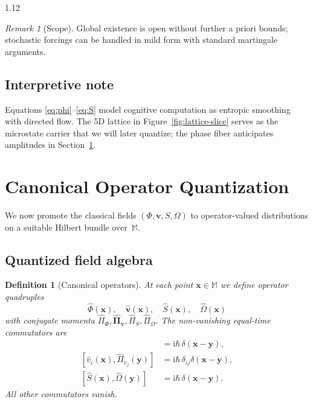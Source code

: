 \documentclass[12pt,a4paper]{article}
\numberwithin{equation}{section}
\newtheorem{definition}{Definition}[section]
\theoremstyle{remark}
\newtheorem{remark}{Remark}[section]
\theoremstyle{definition}
\newcommand{\M}{\mathbb{M}}
\newcommand{\ii}{\mathrm{i}}
\begin{document}
\begin{spacing}{1.12}
\begin{remark}[Scope]
Global existence is open without further a priori bounds; stochastic forcings can be handled in mild form with standard martingale arguments.
\end{remark}

\subsection{Interpretive note}
Equations \eqref{eq:phi}--\eqref{eq:S} model cognitive computation as entropic smoothing with directed flow. The 5D lattice in Figure~\ref{fig:lattice-slice} serves as the microstate carrier that we will later quantize; the phase fiber anticipates amplitudes in Section~\ref{sec:quantization}.


\section{Canonical Operator Quantization}
\label{sec:quantization}

We now promote the classical fields $(\Phi,\mathbf{v},S,\Omega)$ to operator-valued distributions on a suitable Hilbert bundle over~$\M$.

\subsection{Quantized field algebra}
\label{subsec:field-algebra}

\begin{definition}[Canonical operators]
\label{def:canonical-ops}
At each point $\mathbf{x}\in\M$ we define operator quadruples
\[
\hat{\Phi}(\mathbf{x}),\quad
\hat{\mathbf{v}}(\mathbf{x}),\quad
\hat{S}(\mathbf{x}),\quad
\hat{\Omega}(\mathbf{x})
\]
with conjugate momenta $\hat{\Pi}_\Phi,\hat{\boldsymbol{\Pi}}_{\mathbf{v}},\hat{\Pi}_S,\hat{\Pi}_\Omega$.  The non-vanishing equal-time commutators are
\begin{align}
[\hat{\Phi}(\mathbf{x}),\hat{\Pi}_\Phi(\mathbf{y})] &= \ii\hbar\,\delta(\mathbf{x}-\mathbf{y}), \label{eq:comm-Phi}\\
[\hat{v}_i(\mathbf{x}),\hat{\Pi}_{v_j}(\mathbf{y})] &= \ii\hbar\,\delta_{ij}\delta(\mathbf{x}-\mathbf{y}), \label{eq:comm-v}\\
[\hat{S}(\mathbf{x}),\hat{\Omega}(\mathbf{y})] &= \ii\hbar\,\delta(\mathbf{x}-\mathbf{y}). \label{eq:comm-S}
\end{align}
All other commutators vanish.
\end{definition}


\end{spacing}
\end{document}
